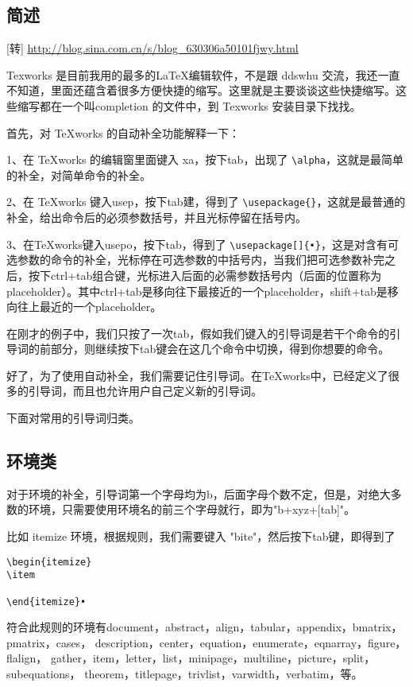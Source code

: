 \subsection{简述}
[转] \url{http://blog.sina.com.cn/s/blog_630306a50101fjwy.html}

Texworks 是目前我用的最多的\LaTeX 编辑软件，不是跟 ddswhu 交流，我还一直不知道，里面还蕴含着很多方便快捷的缩写。这里就是主要谈谈这些快捷缩写。这些缩写都在一个叫completion 的文件中，到 Texworks 安装目录下找找。

首先，对 TeXworks 的自动补全功能解释一下：

1、在 TeXworks 的编辑窗里面键入 xa，按下tab，出现了 \verb|\alpha|，这就是最简单的补全，对简单命令的补全。

2、在 TeXworks 键入usep，按下tab建，得到了 \verb|\usepackage{}|，这就是最普通的补全，给出命令后的必须参数括号，并且光标停留在括号内。

3、在TeXworks键入usepo，按下tab，得到了 \verb|\usepackage[]{•}|，这是对含有可选参数的命令的补全，光标停在可选参数的中括号内，当我们把可选参数补完之后，按下ctrl+tab组合键，光标进入后面的必需参数括号内（后面的位置称为placeholder）。其中ctrl+tab是移向往下最接近的一个placeholder，shift+tab是移向往上最近的一个placeholder。
 
在刚才的例子中，我们只按了一次tab，假如我们键入的引导词是若干个命令的引导词的前部分，则继续按下tab键会在这几个命令中切换，得到你想要的命令。
 
好了，为了使用自动补全，我们需要记住引导词。在TeXworks中，已经定义了很多的引导词，而且也允许用户自己定义新的引导词。
 
下面对常用的引导词归类。
 
\subsection{环境类}
对于环境的补全，引导词第一个字母均为b，后面字母个数不定，但是，对绝大多数的环境，只需要使用环境名的前三个字母就行，即为"b+xyz+[tab]"。
 
比如 itemize 环境，根据规则，我们需要键入 "bite"，然后按下tab键，即得到了
\begin{verbatim}
\begin{itemize}
\item
 
\end{itemize}•	
\end{verbatim}

符合此规则的环境有document，abstract，align，tabular，appendix，bmatrix，pmatrix，cases，
description，center，equation，enumerate，eqnarray，figure，flalign，
gather，item，letter，list，minipage，multiline，picture，split，subequations，
theorem，titlepage，trivlist，varwidth，verbatim，等。
 
